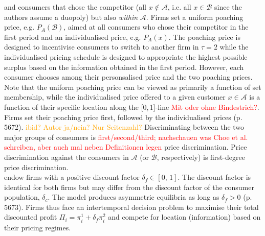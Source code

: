 \documentclass[a4paper, 11 pt, fleqn]{article}
\begin{document}
and consumers that chose the competitor (all $x\notin\mathscr{A}$, i.e. all $x\in\mathscr{B}$ since the authors assume a duopoly) but also
\textit{within} $\mathscr{A}$. Firms set a uniform poaching price, e.g. $P_A(\mathscr{B})$, aimed at all consumers who chose their competitor
in the first period and an individualised price, e.g. $P_A(x)$. The poaching price is designed to incentivise consumers to switch to another
firm in $\tau=2$ while the individualised pricing schedule is designed to appropriate the highest possible surplus based on the information
obtained in the first period.
However, each consumer chooses among their personsalised price and the two poaching prices. Note that the uniform poaching price can be viewed
as primarily a function of set membership, while the individualised price offered to a given customer $x\in\mathscr{A}$ is a function of their
specific location along the [0,\,1]-line \textcolor{red}{Mit oder ohne Bindestrich?}.
Firms set their poaching price first, followed by the individualised prices (p. 5672). \textcolor{orange}{ibid? Autor ja/nein? Nur Seitenzahl?}
Discriminating between the two major groups of consumers is \textcolor{red}{first/second/third; nachschauen was Choe et al. schreiben, aber auch mal neben Definitionen legen}
price discrimination. Price discrimination against the consumers in $\mathscr{A}$ (or $\mathscr{B}$, respectively) is first-degree price discrimination. \\
\citet[p. 5672]{Choe.2018} endow firms with a positive discount factor $\delta_f \in [0,\,1]$. The discount factor is identical for both
firms but may differ from the discount factor of the consumer population, $\delta_c$. The model produces asymmetric equilibria as long as
$\delta_f > 0$ (p. 5673). Firms thus face an intertemporal decision problem to maximise their total discounted profit
$\Pi_i = \pi^1_i + \delta_f\pi^2_i$ and compete for location (information) based on their pricing regimes.
%

%
\end{document}
